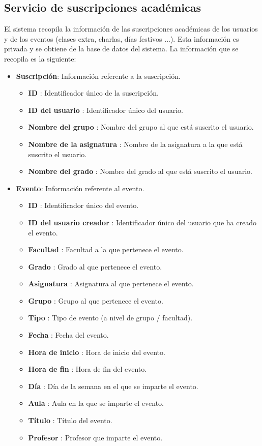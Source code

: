 \subsection{Servicio de suscripciones académicas}

El sistema recopila la información de las suscripciones académicas de los usuarios y de los eventos (clases extra, charlas, días festivos ...). Esta información es privada y se obtiene de la base de datos del sistema. La información que se recopila es la siguiente:

\begin{itemize}
    \item \textbf{Suscripción}: Información referente a la suscripción.
    \begin{itemize}
        \item \textbf{ID} : Identificador único de la suscripción.
        \item \textbf{ID del usuario} : Identificador único del usuario.
        \item \textbf{Nombre del grupo} : Nombre del grupo al que está suscrito el usuario.
        \item \textbf{Nombre de la asignatura} : Nombre de la asignatura a la que está suscrito el usuario.
        \item \textbf{Nombre del grado} : Nombre del grado al que está suscrito el usuario.
    \end{itemize}

    \item \textbf{Evento}: Información referente al evento.
    \begin{itemize}
        \item \textbf{ID} : Identificador único del evento.
        \item \textbf{ID del usuario creador} : Identificador único del usuario que ha creado el evento.
        \item \textbf{Facultad} : Facultad a la que pertenece el evento.
        \item \textbf{Grado} : Grado al que pertenece el evento.
        \item \textbf{Asignatura} : Asignatura al que pertenece el evento.
        \item \textbf{Grupo} : Grupo al que pertenece el evento.
        \item \textbf{Tipo} : Tipo de evento (a nivel de grupo / facultad).
        \item \textbf{Fecha} : Fecha del evento.
        \item \textbf{Hora de inicio} : Hora de inicio del evento.
        \item \textbf{Hora de fin} : Hora de fin del evento.
        \item \textbf{Día} : Día de la semana en el que se imparte el evento.
        \item \textbf{Aula} : Aula en la que se imparte el evento.
        \item \textbf{Título} : Título del evento.
        \item \textbf{Profesor} : Profesor que imparte el evento.
    \end{itemize}
\end{itemize}

